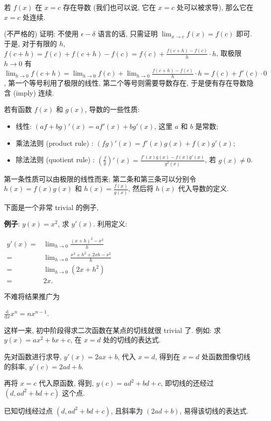 \begin{tcolorbox}[size=fbox, breakable, enhanced jigsaw, title={定理}]
若 $f(x)$ 在 $x=c$ 存在导数 (我们也可以说, 它在
$x=c$ 处可以被求导), 那么它在 $x=c$ 处连续.
\end{tcolorbox}

(不严格的) {\kaishu 证明}: 不使用 $\epsilon - \delta$ 语言的话,
只需证明 $\lim_{x\rightarrow c}f(x)=f(c)$ 即可. 于是, 对于有限的
$h$, $f(c+h)=f(c)+f(c+h)-f(c)=f(c)+\frac{f(c+h)-f(c)}{h}\cdot h$,
取极限 $h\rightarrow0$ 有
$\lim_{h\rightarrow0}f(c+h)=\lim_{h\rightarrow0}f(c)+\lim_{h\rightarrow0}\frac{f(c+h)-f(c)}{h}\cdot h=f(c)+f'(c)\cdot 0$,
第一个等号利用了极限的线性, 第二个等号则需要导数存在,
于是便有存在导数隐含 (imply) 连续.

若有函数 $f(x)$ 和 $g(x)$, 导数的一些性质:

\begin{itemize}

\item
  线性: $(af+bg)'(x)=af'(x)+bg'(x)$, 这里 $a$ 和 $b$ 是常数;
\item
  乘法法则 (product rule) : $(fg)'(x)=f'(x)g(x)+f(x)g'(x)$;
\item
  除法法则 (quotient rule) : $\left(\frac{f}{g}\right)'(x)=\frac{f'(x)g(x)-f(x)g'(x)}{g^2(x)}$,
  若 $g(x)\neq 0$.
\end{itemize}

第一条性质可以由极限的线性而来; 第二条和第三条可以分别令
$h(x)=f(x)g(x)$ 和 $h(x)=\frac{f(x)}{g(x)}$, 然后将 $h(x)$
代入导数的定义.

下面是一个非常 trivial 的例子,

\begin{newquote}
\textbf{例子}: $y(x)=x^2$, 求 $y'(x)$. 利用定义:

$\begin{aligned}y'(x)=&\lim_{h\rightarrow0}\frac{(x+h)^2-x^2}{h}\\=&\lim_{h\rightarrow0}\frac{x^2+h^2+2xh-x^2}{h}\\=&\lim_{h\rightarrow0}(2x+h^2)\\=&2x.\end{aligned}$
\end{newquote}

不难将结果推广为

$\boxed{\frac{\mathrm{d}}{\mathrm{d}x}x^n=nx^{n-1}}.$

\begin{newquote}
这样一来, 初中阶段得求二次函数在某点的切线就很 trivial 了. 例如: 求 $y (x)=ax^2+bx+c$, 在 $x=d$ 处的切线的表达式.

先对函数进行求导, $y'(x)=2ax+b$, 代入 $x=d$, 得到在 $x=d$ 处函数图像切线的斜率, $y'(c)=2ad+b$.

再将 $x=c$ 代入原函数, 得到, $y(c)=ad^2+bd+c$, 即切线的还经过 $(d, ad^2+bd+c)$ 这个点.

已知切线经过点 $(d, ad^2+bd+c)$, 且斜率为 $(2ad+b)$, 易得该切线的表达式.
\end{newquote}